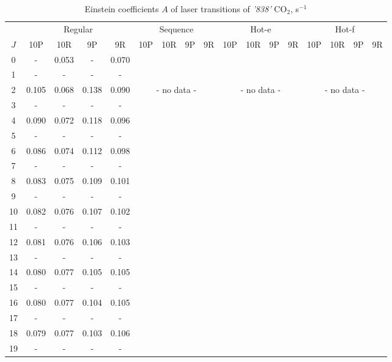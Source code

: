 \documentclass{report}
\begin{document}
\begin{table}
\centering
\caption{Einstein coefficients $A$ of laser transitions of \textit{'838'} CO$_2$, s$^{-1}$}
\label{table:A838}
\scriptsize
\begin{tabular}{|c|cccc|cccc|cccc|cccc|}
\hline
& \multicolumn{4}{c|}{Regular}& \multicolumn{4}{c|}{Sequence}& \multicolumn{4}{c|}{Hot-e}& \multicolumn{4}{c|}{Hot-f}\\
$J$ & 10P & 10R & 9P & 9R & 10P & 10R & 9P & 9R & 10P & 10R & 9P & 9R & 10P & 10R & 9P & 9R\\ 
\hline
0  &   -   & 0.053 &   -   & 0.070 & & & & & & & & & & & &\\
1  &   -   &   -   &   -   &   -   & & & & & & & & & & & &\\
2  & 0.105 & 0.068 & 0.138 & 0.090 & \multicolumn{4}{c|}{- no data -}& \multicolumn{4}{c|}{- no data -}& \multicolumn{4}{c|}{- no data -}\\
3  &   -   &   -   &   -   &   -   & & & & & & & & & & & &\\
4  & 0.090 & 0.072 & 0.118 & 0.096 & & & & & & & & & & & &\\
5  &   -   &   -   &   -   &   -   & & & & & & & & & & & &\\
6  & 0.086 & 0.074 & 0.112 & 0.098 & & & & & & & & & & & &\\
7  &   -   &   -   &   -   &   -   & & & & & & & & & & & &\\
8  & 0.083 & 0.075 & 0.109 & 0.101 & & & & & & & & & & & &\\
9  &   -   &   -   &   -   &   -   & & & & & & & & & & & &\\
10 & 0.082 & 0.076 & 0.107 & 0.102 & & & & & & & & & & & &\\
11 &   -   &   -   &   -   &   -   & & & & & & & & & & & &\\
12 & 0.081 & 0.076 & 0.106 & 0.103 & & & & & & & & & & & &\\
13 &   -   &   -   &   -   &   -   & & & & & & & & & & & &\\
14 & 0.080 & 0.077 & 0.105 & 0.105 & & & & & & & & & & & &\\
15 &   -   &   -   &   -   &   -   & & & & & & & & & & & &\\
16 & 0.080 & 0.077 & 0.104 & 0.105 & & & & & & & & & & & &\\
17 &   -   &   -   &   -   &   -   & & & & & & & & & & & &\\
18 & 0.079 & 0.077 & 0.103 & 0.106 & & & & & & & & & & & &\\
19 &   -   &   -   &   -   &   -   & & & & & & & & & & & &\\

\end{tabular}
\end{table}
\end{document}
